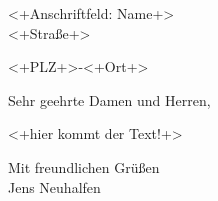 \documentclass[a4paper,11pt]{dinbrief}
\begin{document}
%
%
\subject{<+Subject+>}

\begin{letter}
   {<+Anschriftfeld: Name+> \\
   <+Straße+> \par
   <+PLZ+>-<+Ort+>}
\opening{Sehr geehrte Damen und Herren,}
   
<+hier kommt der Text!+>
   
\closing{Mit freundlichen Grüßen\\[4ex] Jens Neuhalfen}
\end{letter}
\end{document}
